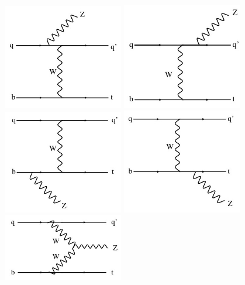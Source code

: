 \begin{figure}[htbp]
\centering
\includegraphics[width=0.47\textwidth]{figs/top-physics/tZq_feyn1.jpg}
\includegraphics[width=0.47\textwidth]{figs/top-physics/tZq_feyn2.jpg}
\includegraphics[width=0.47\textwidth]{figs/top-physics/tZq_feyn3.jpg}
\includegraphics[width=0.47\textwidth]{figs/top-physics/tZq_feyn4.jpg}
\includegraphics[width=0.47\textwidth]{figs/top-physics/tZq_feyn5.jpg}

\end{figure}
